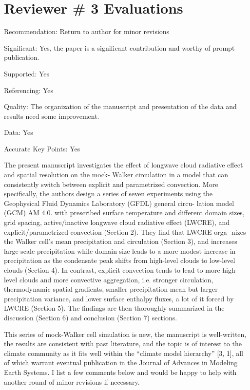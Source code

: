 \documentclass[draft]{agujournal2019}
\begin{document}
\section{Reviewer \# 3 Evaluations}

Recommendation: Return to author for minor revisions

Significant: Yes, the paper is a significant contribution and worthy of prompt publication.

Supported: Yes

Referencing: Yes

Quality: The organization of the manuscript and presentation of the data and results need some improvement.

Data: Yes

Accurate Key Points: Yes

The present manuscript investigates the effect of longwave cloud radiative effect and spatial resolution on the mock-
Walker circulation in a model that can consistently switch between explicit and parametrized convection. More specifically,
the authors design a series of seven experiments using the Geophysical Fluid Dynamics Laboratory (GFDL) general circu-
lation model (GCM) AM 4.0. with prescribed surface temperature and different domain sizes, grid spacing, active/inactive
longwave cloud radiative effect (LWCRE), and explicit/parametrized convection (Section 2). They find that LWCRE orga-
nizes the Walker cell’s mean precipitation and circulation (Section 3), and increases large-scale precipitation while domain
size leads to a more modest increase in precipitation as the condensate peak shifts from high-level clouds to low-level clouds
(Section 4). In contrast, explicit convection tends to lead to more high-level clouds and more convective aggregation, i.e.
stronger circulation, thermodynamic spatial gradients, smaller precipitation mean but larger precipitation variance, and
lower surface enthalpy fluxes, a lot of it forced by LWCRE (Section 5). The findings are then thoroughly summarized in
the discussion (Section 6) and conclusion (Section 7) sections.

This series of mock-Walker cell simulation is new, the manuscript is well-written, the results are consistent with past
literature, and the topic is of interest to the climate community as it fits well within the “climate model hierarchy” [3, 1],
all of which warrant eventual publication in the Journal of Advances in Modeling Earth Systems. I list a few comments
below and would be happy to help with another round of minor revisions if necessary.
\end{document}
